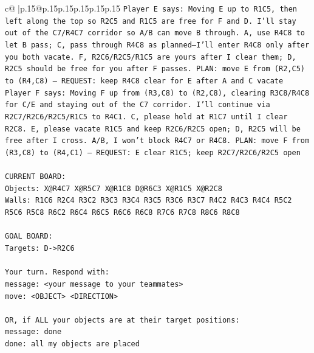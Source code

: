 \documentclass{article}
\begin{document}
{\begin{supertabular}{c@{$\;$}|p{.15\linewidth}@{}p{.15\linewidth}p{.15\linewidth}p{.15\linewidth}p{.15\linewidth}p{.15\linewidth}}
{{{\texttt{Player E says: Moving E up to R1C5, then left along the top so R2C5 and R1C5 are free for F and D. I'll stay out of the C7/R4C7 corridor so A/B can move B through. A, use R4C8 to let B pass; C, pass through R4C8 as planned—I'll enter R4C8 only after you both vacate. F, R2C6/R2C5/R1C5 are yours after I clear them; D, R2C5 should be free for you after F passes. PLAN: move E from (R2,C5) to (R4,C8) — REQUEST: keep R4C8 clear for E after A and C vacate} \\
\texttt{Player F says: Moving F up from (R3,C8) to (R2,C8), clearing R3C8/R4C8 for C/E and staying out of the C7 corridor. I’ll continue via R2C7/R2C6/R2C5/R1C5 to R4C1. C, please hold at R1C7 until I clear R2C8. E, please vacate R1C5 and keep R2C6/R2C5 open; D, R2C5 will be free after I cross. A/B, I won’t block R4C7 or R4C8. PLAN: move F from (R3,C8) to (R4,C1) — REQUEST: E clear R1C5; keep R2C7/R2C6/R2C5 open} \\
\\ 
\texttt{CURRENT BOARD:} \\
\texttt{Objects: X@R4C7 X@R5C7 X@R1C8 D@R6C3 X@R1C5 X@R2C8} \\
\texttt{Walls: R1C6 R2C4 R3C2 R3C3 R3C4 R3C5 R3C6 R3C7 R4C2 R4C3 R4C4 R5C2 R5C6 R5C8 R6C2 R6C4 R6C5 R6C6 R6C8 R7C6 R7C8 R8C6 R8C8} \\
\\ 
\texttt{GOAL BOARD:} \\
\texttt{Targets: D{-}>R2C6} \\
\\ 
\texttt{Your turn. Respond with:} \\
\texttt{message: <your message to your teammates>} \\
\texttt{move: <OBJECT> <DIRECTION>} \\
\\ 
\texttt{OR, if ALL your objects are at their target positions:} \\
\texttt{message: done} \\
\texttt{done: all my objects are placed} \\
            }
        }
    }
     \\ \\


\end{supertabular}}
\end{document}
